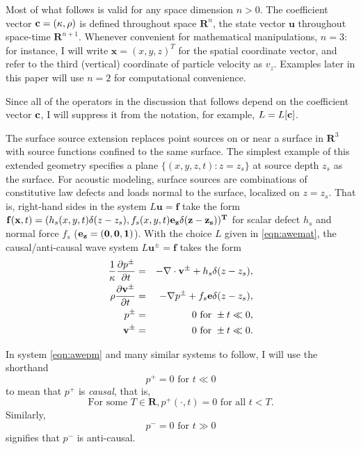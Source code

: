 \documentclass[georeport,12pt]{geophysics}
\newcommand{\bx}{\mathbf{x}}
\newcommand{\bv}{\mathbf{v}}
\newcommand{\bff}{\mathbf{f}}
\newcommand{\bu}{\mathbf{u}}
\newcommand{\bR}{\mathbf{R}}
\begin{document}
Most of what follows is valid for any space dimension $n >0$. The
coefficient vector $\bf{c}=(\kappa,\rho)$ is defined throughout space
$\bR^n$, the state vector $\bu$ throughout space-time
$\bR^{n+1}$. Whenever convenient for mathematical manipulations,
$n=3$: for instance, I will write $\bx=(x,y,z)^T$ for the spatial
coordinate vector, and refer to the third (vertical) coordinate of
particle velocity as $v_z$. Examples
later in this paper will use $n=2$ for computational convenience.

Since all of the operators in the discussion that follows depend on
the coefficient vector 
$\bf{c}$, I will suppress it from the notation, for example, $L=L[\bf{c}]$.

The surface source extension replaces point sources on or near a
surface in $\bR^3$ with source functions confined to the same
surface. The simplest example of this extended geometry specifies a
plane $\{(x,y,z,t): z=z_s\}$ at source depth $z_s$ as the surface. For
acoustic modeling, surface sources are combinations of constitutive law
defects and loads normal to the surface, localized on $z=z_s$. That
is, right-hand sides in the system $L\bu=\bff$ take the form
$\bff(\bx,t) = (h_s(x,y,t)\delta(z-z_s),
f_s(x,y,t)\bf{e}_z\delta(z-z_s))^T$ for scalar defect $h_s$ and normal
force $f_s$ ($\bf{e}_z=(0,0,1)$). With the choice $L$ given in
\ref{eqn:awemat}, the causal/anti-causal wave system $L\bu^{\pm}=\bff$
takes the form
\begin{eqnarray}
\label{eqn:awepm}
\frac{1}{\kappa}\frac{\partial p^{\pm}}{\partial t} & = & - \nabla \cdot \bv^{\pm} +
h_s \delta(z-z_s), \nonumber \\
\rho\frac{\partial \bv^{\pm}}{\partial t} & = & - \nabla p^{\pm} +
                                                f_s{\bf e} \delta(z-z_s),\nonumber \\
p^{\pm} & =& 0 \mbox{ for } \pm t \ll 0,\nonumber\\ 
\bv^{\pm} & = & 0 \mbox{ for } \pm t \ll 0.
\end{eqnarray}

 In system \ref{eqn:awepm} and many similar
systems to follow, I will use the shorthand
\[
  p^+ = 0 \mbox{ for } t \ll 0 
\]
to mean that $p^+$ is {\em causal}, that is,
\[
  \mbox{For some } T \in \bR, p^+(\cdot,t) = 0 \mbox{ for all } t <
  T.
\]
Similarly,
\[
  p^- = 0 \mbox{ for } t \gg 0 
\]
signifies that $p^-$ is anti-causal.
\end{document}
